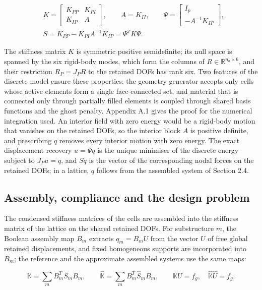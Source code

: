 \documentclass[preprint,12pt,authoryear]{elsarticle}
\begin{document}
\[
\begin{aligned}
&K=\begin{bmatrix}K_{PP}&K_{PI}\\K_{IP}&A\end{bmatrix},\qquad
A=K_{II},\qquad
\Psi=\begin{bmatrix}I_p\\-A^{-1}K_{IP}\end{bmatrix},\\
&S=K_{PP}-K_{PI}A^{-1}K_{IP}=\Psi^TK\Psi.
\end{aligned}
\tag{2}
\]

The stiffness matrix \(K\) is symmetric positive semidefinite; its null space is spanned by the six rigid-body modes, which form the columns of \(R\in\mathbb R^{n_a\times6}\), and their restriction \(R_P=J_PR\) to the retained DOFs has rank six. Two features of the discrete model ensure these properties: the geometry generator accepts only cells whose active elements form a single face-connected set, and material that is connected only through partially filled elements is coupled through shared basis functions and the ghost penalty. Appendix A.1 gives the proof for the numerical integration used. An interior field with zero energy would be a rigid-body motion that vanishes on the retained DOFs, so the interior block \(A\) is positive definite, and prescribing \(q\) removes every interior motion with zero energy. The exact displacement recovery \(u=\Psi q\) is the unique minimiser of the discrete energy subject to \(J_Pu=q\), and \(Sq\) is the vector of the corresponding nodal forces on the retained DOFs; in a lattice, \(q\) follows from the assembled system of Section 2.4.

\subsection{Assembly, compliance and the design problem}

The condensed stiffness matrices of the cells are assembled into the stiffness matrix of the lattice on the shared retained DOFs. For substructure \(m\), the Boolean assembly map \(B_m\) extracts \(q_m=B_mU\) from the vector \(U\) of free global retained displacements, and fixed homogeneous supports are incorporated into \(B_m\); the reference and the approximate assembled systems use the same maps:

\[
\mathbb K=\sum_mB_m^TS_mB_m,\qquad
\widehat{\mathbb K}=\sum_mB_m^T\widehat S_mB_m,
\qquad
\mathbb K U=f_g,\quad\widehat{\mathbb K}\widehat U=f_g.
\tag{3}
\]
\end{document}
